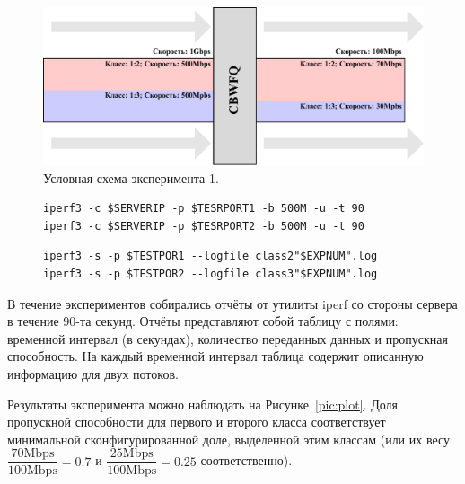 		\begin{figure}[ht!]
			\center
			\includegraphics[scale=0.9]{./pdfimages/exp_scheme.pdf}
			\caption{Условная схема эксперимента 1.}
			\label{pic:exp1}
		\end{figure}

        \begin{figure}[ht!]
    		\center
    		\begin{lstlisting}[frame=lines,
    						  caption={Команда iperf на узле-источнике (клиентская сторона).},
    						  label={lst:iperfsrc}]
iperf3 -c $SERVERIP -p $TESRPORT1 -b 500M -u -t 90
iperf3 -c $SERVERIP -p $TESRPORT2 -b 500M -u -t 90
    		\end{lstlisting}
        \end{figure}	
        \begin{figure}[ht!]
    		\center
    		\begin{lstlisting}[frame=lines,
    						  caption={Команда iperf на узле-цели (серверная сторона).},
    						  label={lst:iperfdst}]
iperf3 -s -p $TESTPOR1 --logfile class2"$EXPNUM".log
iperf3 -s -p $TESTPOR2 --logfile class3"$EXPNUM".log
    		\end{lstlisting}
        \end{figure}


    		В течение экспериментов собирались отчёты от утилиты iperf со стороны сервера в
    		течение 90-та секунд. Отчёты представляют собой таблицу с полями:
			временной интервал (в секундах), количество переданных данных и пропускная способность.
			На каждый временной интервал таблица содержит описанную информацию для двух потоков.

			Результаты эксперимента можно наблюдать на Рисунке~\ref{pic:plot}. Доля пропускной
			способности для первого и второго класса соответствует минимальной сконфигурированной доле, выделенной
			этим классам (или их весу $\dfrac{\text{70Mbps}}{\text{100Mbps}} = 0.7$ и
            $\dfrac{\text{25Mbps}}{\text{100Mbps}} = 0.25$ соответственно). 

